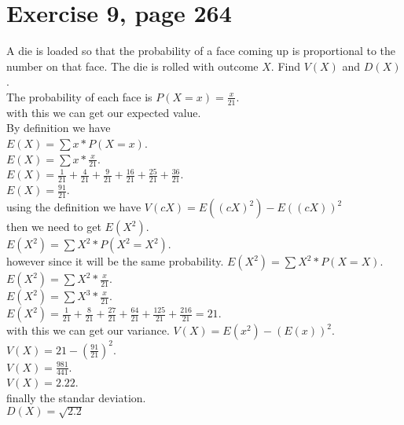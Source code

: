 \documentclass[]{article}
\begin{document}
\section{Exercise 9, page 264}
A die is loaded so that the probability of a face coming up is proportional to the number on that face. The die is rolled with outcome $X$. Find $V(X)$ and $D(X)$.\\
The probability of each face is
$P(X= x) = \frac{x}{21}$.\\
with this we can get our expected value.\\
By definition we have\\
$E(X) = \sum x * P(X=x)$.\\
$E(X) = \sum x * \frac{x}{21}$.\\
$E(X) = \frac{1}{21} + \frac{4}{21} + \frac{9}{21} + \frac{16}{21} + \frac{25}{21} + \frac{36}{21}$.\\
$E(X) = \frac{91}{21} $.\\
using the definition we have $V(cX) = E((cX)^{2})-E((cX))^{2}$\\
then we need to get $E(X^{2})$.\\
$E(X^{2}) = \sum X^{2}*P(X^{2} = X^{2})$.\\
however since it will be the same probability.
$E(X^{2}) = \sum X^{2}*P(X = X)$.\\
$E(X^{2}) = \sum X^{2}*\frac{x}{21}$.\\
$E(X^{2}) = \sum X^{3}*\frac{x}{21}$.\\
$E(X^{2}) = \frac{1}{21} + \frac{8}{21} +\frac{27}{21} + \frac{64}{21} + \frac{125}{21} + \frac{216}{21} = 21 $.\\
with this we can get our variance.
$V(X) = E(x^{2})- (E(x))^{2}$.\\
$V(X)  = 21 - (\frac{91}{21})^{2}$.\\
$V(X)  = \frac{981}{441}$.\\
$V(X)  = 2.22$.\\
finally the standar deviation.\\
$D(X) = \sqrt{2.2}$\\
\end{document}

